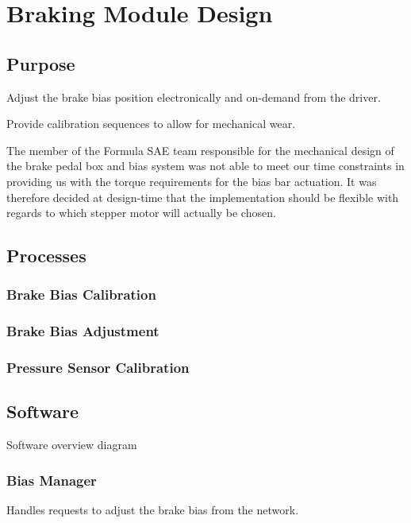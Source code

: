 \section{Braking Module Design\label{sec:Braking-Module-Design}}


\subsection{Purpose}

Adjust the brake bias position electronically and on-demand from the driver.

Provide calibration sequences to allow for mechanical wear.

The member of the Formula SAE team responsible for the mechanical design of the brake pedal box and bias system was not able to meet our time constraints in providing us with the torque requirements for the bias bar actuation. It was therefore decided at design-time that the implementation should be flexible with regards to which stepper motor will actually be chosen.


\subsection{Processes}


\subsubsection{Brake Bias Calibration}


\subsubsection{Brake Bias Adjustment}


\subsubsection{Pressure Sensor Calibration}


\subsection{Software}

Software overview diagram


\subsubsection{Bias Manager}

Handles requests to adjust the brake bias from the network. 

